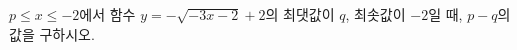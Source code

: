 \hspace*{2mm}\begin{minipage}[t]{\dimexpr\linewidth-2mm\relax}\vspace{0pt}
$p\le x\le -2$에서 함수 $y=-\sqrt{-3x-2}+2$의 최댓값이 $q$, 최솟값이 $-2$일 때, $p-q$의 값을 구하시오.\end{minipage}
